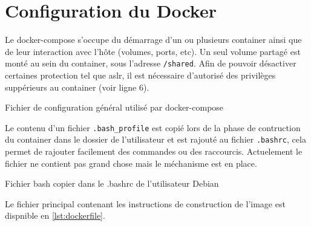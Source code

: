 \chapter{Configuration du Docker}
\label{chap:dockerConf}

Le docker-compose s'occupe du démarrage d'un ou plusieurs container ainsi que de leur interaction avec l'hôte (volumes, ports, etc). Un seul volume partagé est monté au sein du container, sous l'adresse \texttt{/shared}. Afin de pouvoir désactiver certaines protection tel que \gls{aslr}, il est nécessaire d'autorisé des privilèges suppérieurs au container (voir ligne 6).

\begin{listing}
	\caption{Fichier de configuration général utilisé par docker-compose}
	\label{lst:dockerCompose}
\end{listing}

Le contenu d'un fichier \texttt{.bash_profile} est copié lors de la phase de contruction du container dans le dossier de l'utilisateur et est rajouté au fichier \texttt{.bashrc}, cela permet de rajouter facilement des commandes ou des raccourcis. Actuelement le fichier ne contient pas grand chose mais le méchanisme est en place.

\begin{listing}
	\caption{Fichier bash copier dans le .bashrc de l'utilisateur Debian}
	\label{lst:bashProfile}
\end{listing}

Le fichier principal contenant les instructions de construction de l'image est dispnible en \autoref{lst:dockerfile}.
